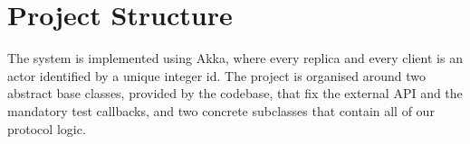 \section{Project Structure}

The system is implemented using Akka, where every replica and every client is an actor identified by a unique integer id. The project is organised around two abstract base classes, provided by the codebase, that fix the external API and the mandatory test callbacks, and two concrete subclasses that contain all of our protocol logic.
